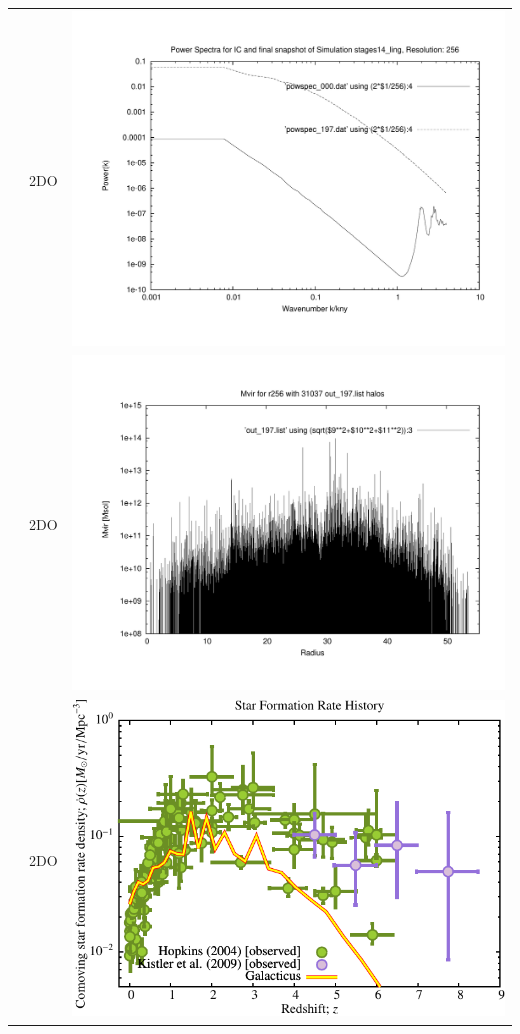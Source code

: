\begin{itemize}
\begin{table}[p]
\begin{tabular}{l|c|c}
 & 2DO & \includegraphics[scale=0.25]{r256/h100/stages14_ling/plot_powspec_stages14_ling.pdf} \\
 & 2DO & \includegraphics[scale=0.25]{r256/h100/stages14_ling/plot_mvir_out_197.pdf} \\
 & 2DO & \includegraphics[scale=0.5]{r256/h100/stages14_ling/Plot_Star_Formation_History.pdf} \\

\end{tabular}
\end{table}
\end{itemize}
